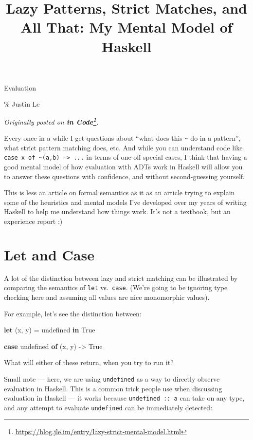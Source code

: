 \documentclass[]{article}
\title{Lazy Patterns, Strict Matches, and All That: My Mental Model of Haskell}
\newenvironment{Shaded}{}{}
\newcommand{\DataTypeTok}[1]{\textcolor[rgb]{0.56,0.13,0.00}{#1}}
\newcommand{\FunctionTok}[1]{\textcolor[rgb]{0.02,0.16,0.49}{#1}}
\newcommand{\KeywordTok}[1]{\textcolor[rgb]{0.00,0.44,0.13}{\textbf{#1}}}
\newcommand{\NormalTok}[1]{#1}
\newcommand{\OtherTok}[1]{\textcolor[rgb]{0.00,0.44,0.13}{#1}}
\renewcommand{\href}[2]{#2\footnote{\url{#1}}}
\begin{document}
\maketitle

Evaluation

\% Justin Le

\emph{Originally posted on
\textbf{\href{https://blog.jle.im/entry/lazy-strict-mental-model.html}{in
Code}}.}

Every once in a while I get questions about ``what does this
\texttt{\textasciitilde{}} do in a pattern'', what strict pattern matching does,
etc. And while you can understand code like
\texttt{case\ x\ of\ \textasciitilde{}(a,b)\ -\textgreater{}\ ...} in terms of
one-off special cases, I think that having a good mental model of how evaluation
with ADTs work in Haskell will allow you to answer these questions with
confidence, and without second-guessing yourself.

This is less an article on formal semantics as it as an article trying to
explain some of the heuristics and mental models I've developed over my years of
writing Haskell to help me understand how things work. It's not a textbook, but
an experience report :)

\section{Let and Case}\label{let-and-case}

A lot of the distinction between lazy and strict matching can be illustrated by
comparing the semantics of \texttt{let} vs.~\texttt{case}. (We're going to be
ignoring type checking here and assuming all values are nice monomorphic
values).

For example, let's see the distinction between:

\begin{Shaded}
\begin{Highlighting}[]
\KeywordTok{let}\NormalTok{ (x, y) }\OtherTok{=} \FunctionTok{undefined}
\KeywordTok{in}  \DataTypeTok{True}

\KeywordTok{case} \FunctionTok{undefined} \KeywordTok{of}
\NormalTok{    (x, y) }\OtherTok{{-}\textgreater{}} \DataTypeTok{True}
\end{Highlighting}
\end{Shaded}

What will either of these return, when you try to run it?

Small note --- here, we are using \texttt{undefined} as a way to directly
observe evaluation in Haskell. This is a common trick people use when discussing
evaluation in Haskell --- it works because \texttt{undefined\ ::\ a} can take on
any type, and any attempt to evaluate \texttt{undefined} can be immediately
detected:
\end{document}
